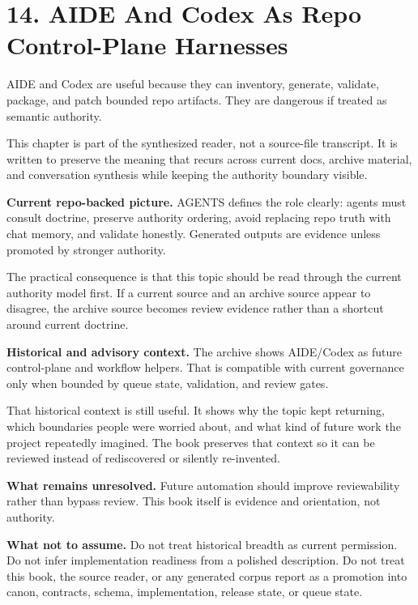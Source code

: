 \documentclass[10.5pt,a4paper,openany]{book}
\begin{document}
\section{14. AIDE And Codex As Repo Control-Plane Harnesses}

AIDE and Codex are useful because they can inventory, generate, validate, package, and patch bounded repo artifacts.\allowbreak{} They are dangerous if treated as semantic authority.\allowbreak{}


This chapter is part of the synthesized reader, not a source-\allowbreak{}file transcript.\allowbreak{} It is written to preserve the meaning that recurs across current docs, archive material, and conversation synthesis while keeping the authority boundary visible.\allowbreak{}


\textbf{Current repo-backed picture.} AGENTS defines the role clearly: agents must consult doctrine, preserve authority ordering, avoid replacing repo truth with chat memory, and validate honestly.\allowbreak{} Generated outputs are evidence unless promoted by stronger authority.\allowbreak{}


The practical consequence is that this topic should be read through the current authority model first.\allowbreak{} If a current source and an archive source appear to disagree, the archive source becomes review evidence rather than a shortcut around current doctrine.\allowbreak{}


\textbf{Historical and advisory context.} The archive shows AIDE/\allowbreak{}Codex as future control-\allowbreak{}plane and workflow helpers.\allowbreak{} That is compatible with current governance only when bounded by queue state, validation, and review gates.\allowbreak{}


That historical context is still useful.\allowbreak{} It shows why the topic kept returning, which boundaries people were worried about, and what kind of future work the project repeatedly imagined.\allowbreak{} The book preserves that context so it can be reviewed instead of rediscovered or silently re-\allowbreak{}invented.\allowbreak{}


\textbf{What remains unresolved.} Future automation should improve reviewability rather than bypass review.\allowbreak{} This book itself is evidence and orientation, not authority.\allowbreak{}


\textbf{What not to assume.} Do not treat historical breadth as current permission.\allowbreak{} Do not infer implementation readiness from a polished description.\allowbreak{} Do not treat this book, the source reader, or any generated corpus report as a promotion into canon, contracts, schema, implementation, release state, or queue state.\allowbreak{}
\end{document}
